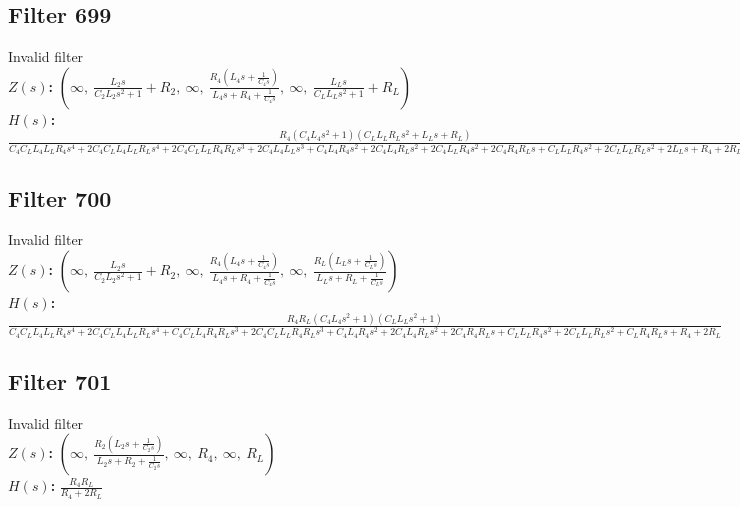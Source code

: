 \documentclass{article}
\begin{document}
\subsection*{Filter 699}
Invalid filter \\ 
\textbf{$Z(s)$:} $\left( \infty, \  \frac{L_{2} s}{C_{2} L_{2} s^{2} + 1} + R_{2}, \  \infty, \  \frac{R_{4} \left(L_{4} s + \frac{1}{C_{4} s}\right)}{L_{4} s + R_{4} + \frac{1}{C_{4} s}}, \  \infty, \  \frac{L_{L} s}{C_{L} L_{L} s^{2} + 1} + R_{L}\right)$ \\ 
\textbf{$H(s)$:} $\frac{R_{4} \left(C_{4} L_{4} s^{2} + 1\right) \left(C_{L} L_{L} R_{L} s^{2} + L_{L} s + R_{L}\right)}{C_{4} C_{L} L_{4} L_{L} R_{4} s^{4} + 2 C_{4} C_{L} L_{4} L_{L} R_{L} s^{4} + 2 C_{4} C_{L} L_{L} R_{4} R_{L} s^{3} + 2 C_{4} L_{4} L_{L} s^{3} + C_{4} L_{4} R_{4} s^{2} + 2 C_{4} L_{4} R_{L} s^{2} + 2 C_{4} L_{L} R_{4} s^{2} + 2 C_{4} R_{4} R_{L} s + C_{L} L_{L} R_{4} s^{2} + 2 C_{L} L_{L} R_{L} s^{2} + 2 L_{L} s + R_{4} + 2 R_{L}}$ \\ 
\subsection*{Filter 700}
Invalid filter \\ 
\textbf{$Z(s)$:} $\left( \infty, \  \frac{L_{2} s}{C_{2} L_{2} s^{2} + 1} + R_{2}, \  \infty, \  \frac{R_{4} \left(L_{4} s + \frac{1}{C_{4} s}\right)}{L_{4} s + R_{4} + \frac{1}{C_{4} s}}, \  \infty, \  \frac{R_{L} \left(L_{L} s + \frac{1}{C_{L} s}\right)}{L_{L} s + R_{L} + \frac{1}{C_{L} s}}\right)$ \\ 
\textbf{$H(s)$:} $\frac{R_{4} R_{L} \left(C_{4} L_{4} s^{2} + 1\right) \left(C_{L} L_{L} s^{2} + 1\right)}{C_{4} C_{L} L_{4} L_{L} R_{4} s^{4} + 2 C_{4} C_{L} L_{4} L_{L} R_{L} s^{4} + C_{4} C_{L} L_{4} R_{4} R_{L} s^{3} + 2 C_{4} C_{L} L_{L} R_{4} R_{L} s^{3} + C_{4} L_{4} R_{4} s^{2} + 2 C_{4} L_{4} R_{L} s^{2} + 2 C_{4} R_{4} R_{L} s + C_{L} L_{L} R_{4} s^{2} + 2 C_{L} L_{L} R_{L} s^{2} + C_{L} R_{4} R_{L} s + R_{4} + 2 R_{L}}$ \\ 
\subsection*{Filter 701}
Invalid filter \\ 
\textbf{$Z(s)$:} $\left( \infty, \  \frac{R_{2} \left(L_{2} s + \frac{1}{C_{2} s}\right)}{L_{2} s + R_{2} + \frac{1}{C_{2} s}}, \  \infty, \  R_{4}, \  \infty, \  R_{L}\right)$ \\ 
\textbf{$H(s)$:} $\frac{R_{4} R_{L}}{R_{4} + 2 R_{L}}$ \\ 
\end{document}
